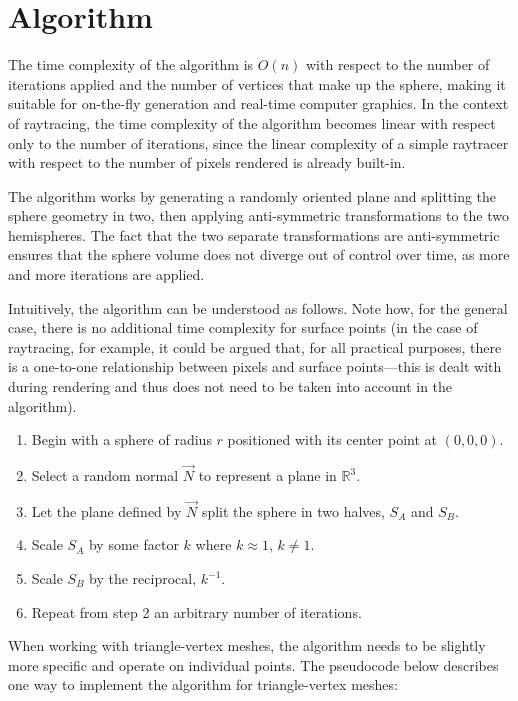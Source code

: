 \chapter{Algorithm}

The time complexity of the algorithm is $O(n)$ with respect to the number of iterations applied and
the number of vertices that make up the sphere, making it suitable for on-the-fly generation and
real-time computer graphics.  In the context of raytracing, the time complexity of the algorithm
becomes linear with respect only to the number of iterations, since the linear complexity of a
simple raytracer with respect to the number of pixels rendered is already built-in.

The algorithm works by generating a randomly oriented plane and splitting the sphere geometry in
two, then applying anti-symmetric transformations to the two hemispheres.  The fact that the two
separate transformations are anti-symmetric ensures that the sphere volume does not diverge out of
control over time, as more and more iterations are applied.

Intuitively, the algorithm can be understood as follows. Note how, for the general case, there is no
additional time complexity for surface points (in the case of raytracing, for example, it could be
argued that, for all practical purposes, there is a one-to-one relationship between pixels and
surface points---this is dealt with during rendering and thus does not need to be taken into account
in the algorithm).

\begin{enumerate}
  \itemsep0em
  \item Begin with a sphere of radius $r$ positioned with its center point at $(0, 0, 0)$.
  \item Select a random normal $\vec{N}$ to represent a plane in $\mathbb{R}^3$.
  \item Let the plane defined by $\vec{N}$ split the sphere in two halves, $S_A$ and $S_B$.
  \item Scale $S_A$ by some factor $k$ where $k\approx 1$, $k\ne 1$.
  \item Scale $S_B$ by the reciprocal, $k^{-1}$.
  \item Repeat from step 2 an arbitrary number of iterations.
\end{enumerate}

\noindent When working with triangle-vertex meshes, the algorithm needs to be slightly more specific
and operate on individual points.  The pseudocode below describes one way to implement the algorithm
for triangle-vertex meshes:

